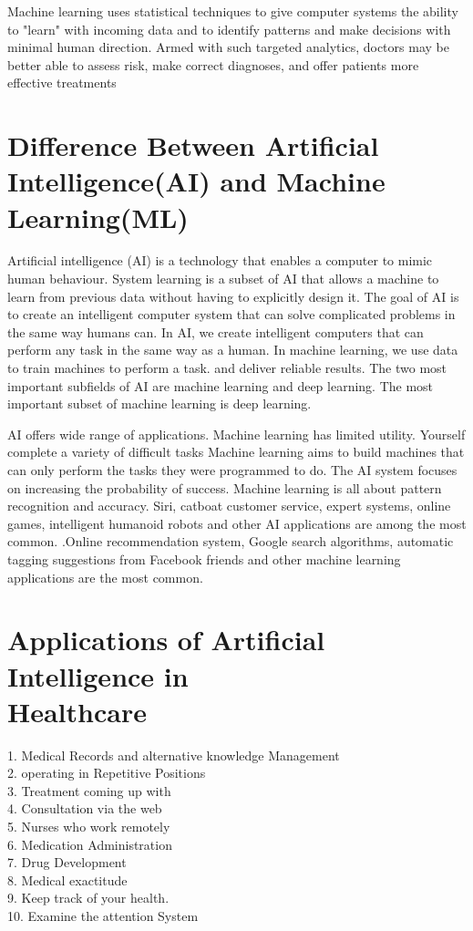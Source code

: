 \documentclass[12pt]{article}
\begin{document}
Machine learning uses statistical techniques to give computer systems the ability to "learn" with incoming data and to identify patterns and make decisions with minimal human direction. Armed with such targeted analytics, doctors may be better able to assess risk, make correct diagnoses, and offer patients more effective treatments

\section{Difference Between Artificial Intelligence(AI) and Machine Learning(ML)}
\hspace{1cm}
Artificial intelligence (AI) is a technology that enables a computer to mimic human behaviour. System learning is a subset of AI that allows a machine to learn from previous data without having to explicitly design it. The goal of AI is to create an intelligent computer system that can solve complicated problems in the same way humans can. In AI, we create intelligent computers that can perform any task in the same way as a human. In machine learning, we use data to train machines  to perform a task. and deliver reliable results. The two most important subfields of AI are machine learning and deep learning. The most important subset of machine learning is deep learning. 

AI offers wide range of applications. Machine learning has limited utility. Yourself complete a variety of difficult tasks Machine learning aims to build machines that can only perform the tasks they were programmed to do. The AI system focuses on increasing the probability of success. Machine learning is all about pattern recognition and accuracy. Siri, catboat customer service, expert systems, online games, intelligent humanoid robots and other AI applications are among the most common. .Online recommendation system, Google search algorithms, automatic tagging suggestions from Facebook friends and other machine learning applications are the most common.

 

\section{Applications of Artificial Intelligence in\\Healthcare}

1. Medical Records and alternative knowledge Management\\
2. operating in Repetitive Positions\\
3. Treatment coming up with\\
4. Consultation via the web\\
5. Nurses who work remotely\\
6. Medication Administration\\
7. Drug Development\\
8. Medical exactitude\\
9. Keep track of your health.\\
10. Examine the attention System\\
\end{document}
